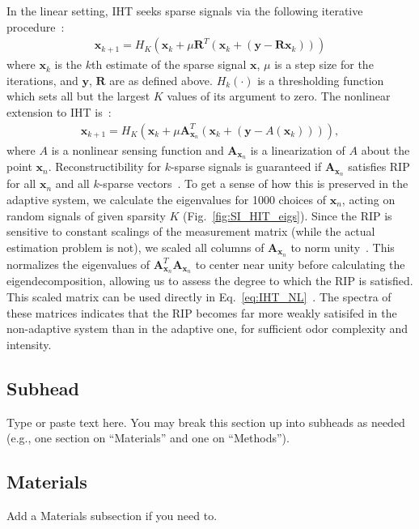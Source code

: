 \documentclass[9pt,twoside,lineno]{pnas-new}
\begin{document}
In the linear setting, IHT seeks sparse signals via the following iterative procedure~\cite{IHT}:
\begin{align}
    \mathbf{x}_{k + 1} = H_K(\mathbf{x}_k + \mu\mathbf{R}^T(\mathbf {x}_k + (\mathbf y - \mathbf R\mathbf {x}_k)))
    \label{eq:IHT}
\end{align}
where $\mathbf{x}_k$ is the $k$th estimate of the sparse signal $\mathbf{x}$, $\mu$ is a step size for the iterations, and $\mathbf y$, $\mathbf R$ are as defined above. $H_k(\cdot)$ is a thresholding function which sets all but the largest $K$ values of its argument to zero. The nonlinear extension to IHT is~\cite{nonlin_CS}: 
\begin{align}
    \mathbf{x}_{k + 1} = H_K(\mathbf{x}_k + \mu\mathbf{A}_{\mathbf x_n}^T(\mathbf {x}_k + (\mathbf y - A(\mathbf {x}_k)))),
    \label{eq:IHT_NL}
\end{align}
where $A$ is a nonlinear sensing function and $\mathbf{A}_{\mathbf x_n}$ is a linearization of $A$ about the point $\mathbf x_n$. Reconstructibility for $k$-sparse signals is guaranteed if $\mathbf{A}_{\mathbf x_n}$ satisfies RIP for all $\mathbf x_n$ and all $k$-sparse vectors~\cite{IHT}. To get a sense of how this is preserved in the adaptive system, we calculate the eigenvalues for 1000 choices of $\mathbf x_n$, acting on random signals of given sparsity $K$ (Fig.~\ref{fig:SI_HIT_eigs}). Since the RIP is sensitive to constant scalings of the measurement matrix (while the actual estimation problem is not), we scaled all columns of $\mathbf{A}_{\mathbf x_n}$ to norm unity~\cite{using_IHT}. This normalizes the eigenvalues of $\mathbf{A}^T_{\mathbf x_n}\mathbf{A}_{\mathbf x_n}$ to center near unity before calculating the eigendecomposition, allowing us to assess the degree to which the RIP is satisfied. This scaled matrix can be used directly in Eq.~\ref{eq:IHT_NL}~\cite{nonlin_CS,using_IHT}. The spectra of these matrices indicates that the RIP becomes far more weakly satisifed in the non-adaptive system than in the adaptive one, for sufficient odor complexity and intensity.



\iffalse
\subsection*{Subhead}
Type or paste text here. You may break this section up into subheads as needed (e.g., one section on ``Materials'' and one on ``Methods'').

\subsection*{Materials}
Add a Materials subsection if you need to.
\end{document}
